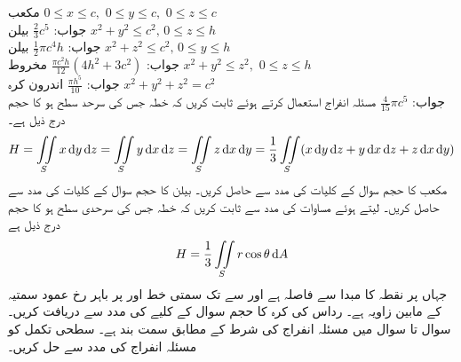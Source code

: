 \quad مکعب 
$0\le x\le c,\,\, 0 \le y \le c,\,\, 0\le z \le c\,\,$\\
جواب:\quad
$\tfrac{2}{3}c^5$
\quad بیلن 
$x^2+y^2 \le c^2,\, 0\le z \le h\,\,$\\
جواب:\quad
$\tfrac{1}{2}\pi c^4 h$
\quad بیلن 
$x^2+z^2 \le c^2,\, 0\le y \le h\,\,$\\
جواب:\quad
$\tfrac{\pi c^2h}{12}(4h^2+3c^2)$
\quad مخروط
$x^2+y^2\le z^2,\,\, 0\le z \le h\,\,$\\
جواب:\quad
$\tfrac{\pi h^5}{10}$
\quad اندرون کرہ
$x^2+y^2+z^2=c^2\,\,$\\
جواب:\quad
$\tfrac{4}{15}\pi c^5$
\quad مسئلہ انفراج استعمال کرتے ہوئے ثابت کریں کہ خطہ  جس کی سرحد سطح  ہو کا حجم  درج ذیل ہے۔
\begin{align*}
H=\iint\limits_S x\dif y\dif z=\iint\limits_S y\dif x \dif z=\iint\limits_S z\dif x\dif y=\frac{1}{3}\iint\limits_S (x\dif y\dif z+y\dif x\dif z+z\dif x\dif y)
\end{align*}
\quad مکعب کا حجم سوال  کے کلیات کی مدد سے حاصل کریں۔
\quad بیلن  کا حجم سوال  کے کلیات کی مدد سے حاصل کریں۔
\quad 
{} لیتے ہوئے مساوات  کی مدد سے ثابت کریں کہ خطہ  جس کی سرحدی سطح  ہو کا حجم درج ذیل ہے
\begin{align*}
H=\frac{1}{3}\iint\limits_S r\cos \theta \dif A
\end{align*}
جہاں  پر نقطہ  کا مبدا  سے فاصلہ  ہے اور  سے  تک سمتی خط  اور  پر باہر رخ  عمود سمتیہ کے مابین زاویہ  ہے۔  
\quad رداس  کی کرہ کا حجم سوال  کے کلیے کی مدد سے دریافت کریں۔
سوال  تا سوال  میں  مسئلہ انفراج کی شرط کے مطابق سمت بند ہے۔ سطحی تکمل کو مسئلہ انفراج کی مدد سے حل کریں۔ 

